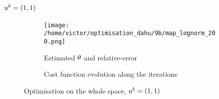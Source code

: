 \documentclass[../../Main_ManuscritThese.tex]{subfiles}
\begin{document}
\subsection*{$u^b=(1, 1)$}
\begin{figure}[ht]
  \begin{subfigure}{\textwidth}
  \centering
  \texttt{[image: /home/victor/optimisation\_dahu/9b/map\_lognorm\_200.png]}
  \caption{Estimated $\theta$ and relative-error}
\end{subfigure}
\begin{subfigure}{\textwidth}
  \centering
  \resizebox{1\textwidth}{!}{}
    \caption{Cost function evolution along the iterations}
\end{subfigure}
\caption{Optimisation on the whole space, $u^b=(1, 1)$}
\end{figure}

\markchapterend


\pagestyle{appendixStyle}



\subfileLocal{
	\pagestyle{empty}
	
	

}

\endgroup
\end{document}
